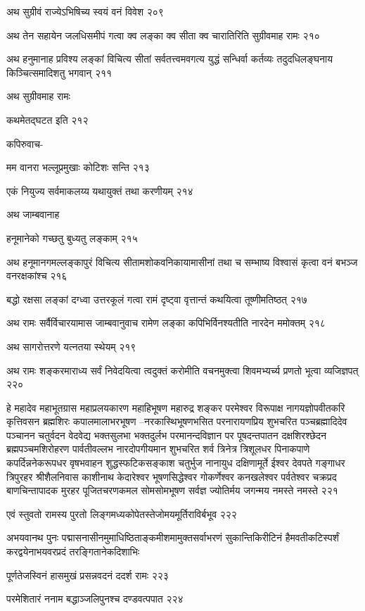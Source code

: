 अथ सुग्रीवं राज्येऽभिषिच्य स्वयं वनं विवेश २०९

अथ तेन सहायेन जलधिसमीपं गत्वा क्व लङ्का क्व सीता क्व चारातिरिति सुग्रीवमाह रामः २१०

अथ हनुमानाह प्रविश्य लङ्कां विचित्य सीतां सर्वतत्त्वमवगत्य युद्धं सन्धिर्वा कर्तव्यः
तदुदधिलङ्घनाय किञ्चित्समादिशतु भगवान् २११

अथ सुग्रीवमाह रामः

कथमेतद्घटत इति २१२

कपिरुवाच-

मम वानरा भल्लूप्रमुखाः कोटिशः सन्ति २१३

एकं नियुज्य सर्वमाकलय्य यथायुक्तं तथा करणीयम् २१४

अथ जाम्बवानाह

हनूमानेको गच्छतु बुध्यतु लङ्काम् २१५

अथ हनूमानगमल्लङ्कापुरं विचित्य सीतामशोकवनिकायामासीनां तथा च सम्भाष्य विश्वासं कृत्वा वनं
बभञ्ज वनरक्षकांश्च २१६

बद्धो रक्षसा लङ्कां दग्ध्वा उत्तरकूलं गत्वा रामं दृष्ट्वा वृत्तान्तं कथयित्वा तूष्णीमतिष्ठत् २१७

अथ रामः सर्वैर्विचारयामास जाम्बवानुवाच रामेण लङ्का कपिभिर्विनश्यतीति नारदेन ममोक्तम्
 २१८

अथ सागरोत्तरणे यत्नतया स्थेयम् २१९

अथ रामः शङ्करमाराध्य सर्वं निवेदयित्वा त्वदुक्तं करोमीति वचनमुक्त्वा शिवमभ्यर्च्य प्रणतो
भूत्वा व्यजिज्ञपत् २२०

हे महादेव महाभूतग्रास महाप्रलयकारण महाहिभूषण महारुद्र शङ्कर परमेश्वर विरूपाक्ष
नागयज्ञोपवीतकरि कृत्तिवसन ब्रह्मशिरः कपालमालाभरभूषण –नरकास्थिभूषणभसित
परनारायणप्रिय शुभचरित पञ्चब्रह्मादिदेव पञ्चानन चतुर्वदन वेदवेद्य भक्तसुलभा भक्तदुर्लभ
परमानन्दविज्ञान पर पूषदन्तपातन दक्षशिरश्छेदन ब्रह्मपञ्चमशिरोहरण पार्वतीवल्लभ
नारदोपगीयमान शुभचरित शर्व त्रिनेत्र त्रिशूलधर पिनाकपाणे कपर्दिन्ननेकरूपधर वृषभवाहन
शुद्धस्फटिकसङ्काश चतुर्भुज नानायुध दक्षिणामूर्ते ईश्वर देवपते गङ्गाधर त्रिपुरहर श्रीशैलनिवास
काशीनाथ केदारेश्वर भूषणसिद्धेश्वर गोकर्णेश्वर कनखलेश्वर पर्वतेश्वर चक्रप्रद बाणचिन्तापादक
मुरहर पूजितचरणकमल सोमसोमभूषण सर्वज्ञ ज्योतिर्मय जगन्मय नमस्ते नमस्ते २२१

एवं स्तुवतो रामस्य पुरतो लिङ्गमध्यकोपेतस्तेजोमयमूर्तिराविर्बभूव २२२

अभयवानथ पुनः पद्मासनासीनमुमाधिष्ठिताङ्कमीशमामुक्तसर्वाभरणं सुकान्तिकिरीटिनं
हैमवतीकटिस्पर्शं करद्वयेनाभयवरप्रदं तरङ्गितानेकदिशाभिः

पूर्णतेजस्विनं हासमुखं प्रसन्नवदनं ददर्श रामः २२३

परमेशितारं ननाम बद्धाञ्जलिपुनश्च दण्डवत्पपात २२४

